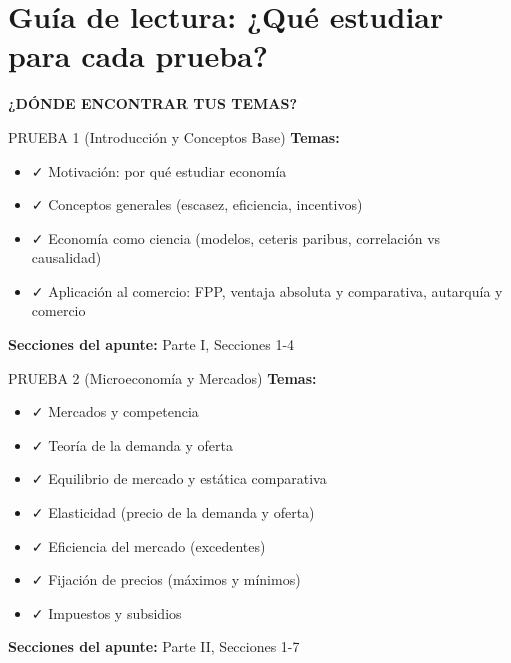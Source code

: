 \documentclass[11pt,a4paper]{article}
\begin{document}
\newpage

\tableofcontents

\newpage

\section*{Guía de lectura: ¿Qué estudiar para cada prueba?}

\begin{center}
\textbf{\Large ¿DÓNDE ENCONTRAR TUS TEMAS?}
\end{center}

\vspace{1cm}

\begin{prueba}{PRUEBA 1 (Introducción y Conceptos Base)}
\textbf{Temas:}
\begin{itemize}
    \item ✓ Motivación: por qué estudiar economía
    \item ✓ Conceptos generales (escasez, eficiencia, incentivos)
    \item ✓ Economía como ciencia (modelos, ceteris paribus, correlación vs causalidad)
    \item ✓ Aplicación al comercio: FPP, ventaja absoluta y comparativa, autarquía y comercio
\end{itemize}
\textbf{Secciones del apunte:} Parte I, Secciones 1-4
\end{prueba}

\vspace{0.7cm}

\begin{prueba}{PRUEBA 2 (Microeconomía y Mercados)}
\textbf{Temas:}
\begin{itemize}
    \item ✓ Mercados y competencia
    \item ✓ Teoría de la demanda y oferta
    \item ✓ Equilibrio de mercado y estática comparativa
    \item ✓ Elasticidad (precio de la demanda y oferta)
    \item ✓ Eficiencia del mercado (excedentes)
    \item ✓ Fijación de precios (máximos y mínimos)
    \item ✓ Impuestos y subsidios
\end{itemize}
\textbf{Secciones del apunte:} Parte II, Secciones 1-7
\end{prueba}
\end{document}
